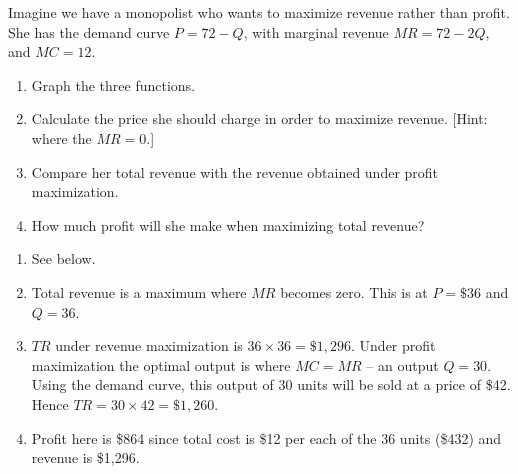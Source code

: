 \begin{enumialphparenastyle}
\begin{ex}\label{ex:ch10ex2}
Imagine we have a monopolist who wants to maximize revenue rather than profit. She has the demand curve $P=72-Q$, with marginal revenue $MR=72-2Q$, and $MC=12$.
\begin{enumerate}
	\item	Graph the three functions.
	\item	Calculate the price she should charge in order to maximize revenue. [Hint: where the $MR=0$.]
	\item	Compare her total revenue with the revenue obtained under profit maximization.
	\item	How much profit will she make when maximizing total revenue?
\end{enumerate}
\begin{sol}
\begin{enumerate}
	\item	See below.
	\item	Total revenue is a maximum where $MR$ becomes zero. This is at $P=\$36$ and $Q=36$.
	\item	$TR$ under revenue maximization is $36\times 36=\$1,296$. Under profit maximization the optimal output is where $MC=MR$ -- an output $Q=30$. Using the demand curve, this output of 30 units will be sold at a price of \$42. Hence $TR=30\times 42=\$1,260$.
	\item	Profit here is \$864 since total cost is \$12 per each of the 36 units (\$432) and revenue is \$1,296.
\end{enumerate}
\begin{center}
\end{center}
\end{sol}
\end{ex}


\end{enumialphparenastyle}
